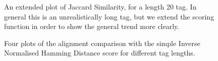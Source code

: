 \documentclass{l4proj}
\begin{document}
\begin{figure} \label{fig:jaccard20}
    \centering

    \caption{An extended plot of Jaccard Similarity, for a length 20 tag. In general this is an unrealistically long tag, but we extend the scoring function in order to show the general trend more clearly.}

    \label{fig:jaccard20}
\end{figure}

\begin{figure} \label{fig:simples}
    \centering

    \caption{Four plots of the alignment comparison with the simple Inverse Normalised Hamming Distance score for different tag lengths.}

    \label{fig:simples}
\end{figure}
\end{document}
